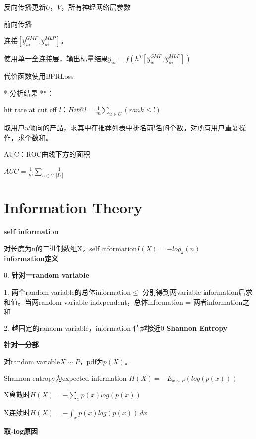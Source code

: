 \documentclass[UTF8]{ctexart}
\begin{document}
  \quad \quad 反向传播更新$U$，$V$，所有神经网络层参数

  \quad 前向传播

  \quad \quad 连接$[\hat{y}_{ui}^{GMF}, \hat{y}_{ui}^{MLP}]$。
  
  \quad \quad 使用单一全连接层，输出标量结果$\hat{y}_{ui} = f(h^T[\hat{y}_{ui}^{GMF}, \hat{y}_{ui}^{MLP}])$

  \quad 代价函数使用BPRLoss

  \quad ** 分析结果 **：

  \quad \quad hit rate at cut off $l$：$Hit @ l = \frac{1}{m}\sum_{u \in U}(rank_{} \leq l)$

  \quad \quad \quad 取用户$u$倾向的产品，求其中在推荐列表中排名前$l$名的个数。对所有用户重复操作，求个数和。

  \quad \quad AUC：ROC曲线下方的面积

  \quad \quad \quad $AUC = \frac{1}{m}\sum_{u \in U}\frac{1}{|I \setminus |}$
  
\section{Information Theory}
\noindent \textbf{self information}

  对长度为n的二进制数组X，self information$I(X) = -log_2(n)$\\
\textbf{information定义}

  0. \textbf{针对一random variable}

  1. 两个random variable的总体information$\leq$ 分别得到两variable information后求和值。当两random variable independent，总体information = 两者information之和

  2. 越固定的random variable，information 值越接近0
\textbf{Shannon Entropy}

  \textbf{针对一分部}

  对random variable$X \sim P$，pdf为$p(X)$。
  
  Shannon entropy为expected information $H(X) = -E_{x \sim P}(log(p(x)))$

  \quad X离散时$H(X) = - \sum_{x} p(x)log(p(x))$

  \quad X连续时$H(X) = -\int_{x} p(x)log(p(x)) \,dx $
  
  \textbf{取-log原因}
  
\end{document}
